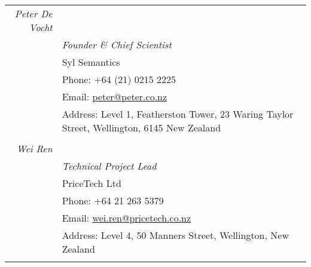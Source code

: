 \documentclass[a4paper,10pt]{article} %
\begin{document}
\begin{tabular}{r|p{11cm}}


\emph{Peter De Vocht}&  \\
& \emph{Founder \& Chief Scientist}\\ 
& Syl Semantics \\
& Phone: +64 (21) 0215 2225\\
& Email: \href{mailto:peter@peter.co.nz}{peter@peter.co.nz}\\
& Address: Level 1, Featherston Tower, 23 Waring Taylor Street, Wellington, 6145 New Zealand \\
\multicolumn{2}{c}{} \\




\emph{Wei Ren}&  \\
& \emph{Technical Project Lead}\\ 
& PriceTech Ltd\\
& Phone: +64 21 263 5379\\
& Email: \href{mailto:wei.ren@pricetech.co.nz}{wei.ren@pricetech.co.nz}\\
& Address: Level 4, 50 Manners Street, Wellington, New Zealand \\
\multicolumn{2}{c}{} \\




\end{tabular}
\end{document}
